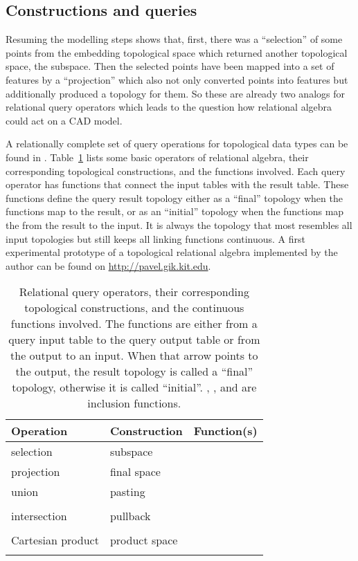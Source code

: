 \documentclass[5p]{elsarticle}
\newcommand{\qq}[1]{``#1''}
\begin{document}
\subsection{Constructions and queries}

Resuming the modelling steps shows that, first, there was a \qq{selection} of some 
points from the embedding topological space which returned another topological space, 
the subspace. Then the selected points have been mapped into a set of features by a 
\qq{projection} which also not only converted points into features but additionally produced 
a topology for them. So these are already two analogs for relational query operators which 
leads to the question how relational algebra could act on a CAD model. 

A relationally complete set of query operations for topological data types 
can be found in \cite{BradleyPaul}. 
Table~\ref{tab:queries} lists some basic operators of relational algebra, their 
corresponding topological constructions, and the functions involved. 
Each query operator has functions that connect the input tables with the result table. 
These functions define the query result topology either as a \qq{final} topology when the 
functions map to the result, or as an \qq{initial} topology when the functions map the from 
the result to the input. 
It is always the topology that most resembles all input topologies but still keeps all 
linking functions continuous. A first experimental prototype of a topological relational 
algebra implemented by the author can be found on \url{http://pavel.gik.kit.edu}.  

\begin{table}[h]
  \centering
  \begin{tabular}{lll}
    Operation  & Construction & Function(s) \\
    \hline
    selection  & subspace    & \\
    [\jot]
    projection & final space & \\
    [\jot]
    union      & pasting     & \\
               &             & \\
    [\jot]
    intersection& pullback   & \\
               &             & \\
    [\jot]
    Cartesian product 
               & product space 
                             & \\
               &             & 
  \end{tabular}
  \caption{Relational query operators, their corresponding topological 
constructions, and the continuous functions involved. The functions are either 
 from a query input table  to the query output table 
 or  from the output 
to an input. When that arrow points to the output, the result topology 
is called a \qq{final} topology, otherwise it is called \qq{initial}. 
, , and  are inclusion functions.}
  \label{tab:queries}
\end{table}
\end{document}
